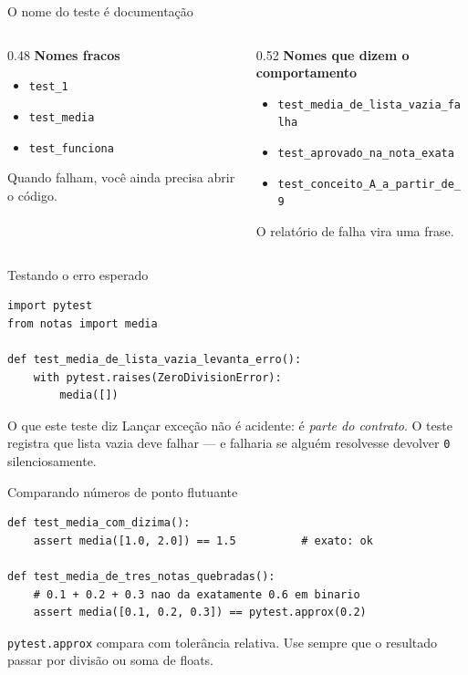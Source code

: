 \documentclass[aspectratio=169]{beamer}
\begin{document}
\begin{frame}{O nome do teste é documentação}
  \begin{columns}[T]
    \begin{column}{0.48\textwidth}
      \textbf{Nomes fracos}
      \begin{itemize}
        \item \texttt{test\_1}
        \item \texttt{test\_media}
        \item \texttt{test\_funciona}
      \end{itemize}
      \small Quando falham, você ainda precisa abrir o código.
    \end{column}
    \begin{column}{0.52\textwidth}
      \textbf{Nomes que dizem o comportamento}
      \begin{itemize}
        \item \texttt{test\_media\_de\_lista\_vazia\_falha}
        \item \texttt{test\_aprovado\_na\_nota\_exata}
        \item \texttt{test\_conceito\_A\_a\_partir\_de\_9}
      \end{itemize}
      \small O relatório de falha vira uma frase.
    \end{column}
  \end{columns}
\end{frame}

\begin{frame}[fragile]{Testando o erro esperado}
\begin{lstlisting}
import pytest
from notas import media

def test_media_de_lista_vazia_levanta_erro():
    with pytest.raises(ZeroDivisionError):
        media([])
\end{lstlisting}
  \begin{block}{O que este teste diz}
    Lançar exceção não é acidente: é \emph{parte do contrato}. O teste
    registra que lista vazia deve falhar --- e falharia se alguém
    resolvesse devolver \texttt{0} silenciosamente.
  \end{block}
\end{frame}

\begin{frame}[fragile]{Comparando números de ponto flutuante}
\begin{lstlisting}
def test_media_com_dizima():
    assert media([1.0, 2.0]) == 1.5          # exato: ok

def test_media_de_tres_notas_quebradas():
    # 0.1 + 0.2 + 0.3 nao da exatamente 0.6 em binario
    assert media([0.1, 0.2, 0.3]) == pytest.approx(0.2)
\end{lstlisting}
  \small \texttt{pytest.approx} compara com tolerância relativa. Use sempre
  que o resultado passar por divisão ou soma de floats.
\end{frame}
\end{document}
